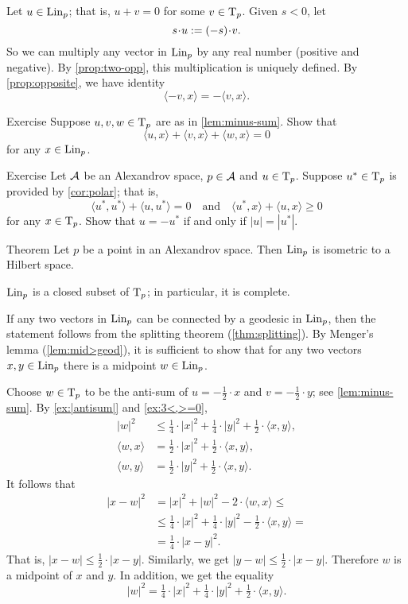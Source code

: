 Let $u\in \mathop{\rm Lin}\nolimits_p$; that is, $u+v=0$ for some $v\in\mathrm{T}_p$.
Given $s<0$, let 
\[s\cdot u\df (-s)\cdot v.\]
So we can multiply any vector in $\mathop{\rm Lin}\nolimits_p$ by any real number (positive and negative).
By \ref{prop:two-opp}, this multiplication is uniquely defined.
By \ref{prop:opposite}, we have identity
\[\langle -v,x\rangle=-\langle v,x\rangle.\]


\begin{thm}{Exercise}\label{ex:3<,>=0}
Suppose $u,v,w\in\mathrm{T}_p$ are as in \ref{lem:minus-sum}.
Show that
\[\langle u,x\rangle +\langle v,x\rangle +\langle w,x\rangle = 0\]
for any $x\in \mathop{\rm Lin}\nolimits_p$.
\end{thm}

\begin{thm}{Exercise}\label{ex:-u}
Let $\mathcal{A}$ be an Alexandrov space,
$p\in \mathcal{A}$ and $u\in \mathrm{T}_p$.
Suppose $u^*\in \mathrm{T}_p$ is provided by \ref{cor:polar};
that is, 
\[\langle u^*,u^*\rangle +\langle u,u^*\rangle = 0
\quad\text{and}\quad
\langle u^*,x\rangle +\langle u,x\rangle \ge 0
\]
for any $x\in \mathrm{T}_p$.
Show that $u=-u^*$ if and only if $|u|=|u^*|$.
\end{thm}

\begin{thm}{Theorem}\label{thm:lin-subcone}
Let $p$ be a point in an Alexandrov space. 
Then $\mathop{\rm Lin}\nolimits_p$ is isometric to a Hilbert space.
\end{thm}

$\mathop{\rm Lin}\nolimits_p$ is a closed subset of $\mathrm{T}_p$;
in particular, it is complete.

If any two vectors in $\mathop{\rm Lin}\nolimits_p$ can be connected by a geodesic in $\mathop{\rm Lin}\nolimits_p$,
then the statement follows from the splitting theorem (\ref{thm:splitting}).
By Menger's lemma (\ref{lem:mid>geod}), it is sufficient to show that for any two vectors $x,y\in\mathop{\rm Lin}\nolimits_p$
there is a midpoint $w\in \mathop{\rm Lin}\nolimits_p$.

Choose $w\in \mathrm{T}_p$ to be the anti-sum of $u=-\tfrac{1}{2}\cdot x$ and $v=-\tfrac{1}{2}\cdot y$;
see \ref{lem:minus-sum}.
By \ref{ex:|antisum|} and \ref{ex:3<,>=0},
\begin{align*}
|w|^2&\le \tfrac14\cdot |x|^2+\tfrac14\cdot|y|^2+\tfrac12\cdot\langle x,y\rangle,
\\
\langle w,x\rangle&= \tfrac12\cdot|x|^2+\tfrac12\cdot\langle x,y\rangle,
\\
\langle w,y\rangle&= \tfrac12\cdot|y|^2+\tfrac12\cdot\langle x,y\rangle.
\end{align*}
It follows that 
\begin{align*}
|x-w|^2
&= |x|^2+|w|^2-2\cdot\langle w,x\rangle\le
\\
&\le \tfrac14\cdot |x|^2+\tfrac14\cdot|y|^2-\tfrac12\cdot\langle x,y\rangle=
\\
&=\tfrac14\cdot|x-y|^2.
\end{align*}
That is, $|x-w|\le \tfrac12\cdot|x-y|$.
Similarly, we get $|y-w|\le \tfrac12\cdot|x-y|$.
Therefore $w$ is a midpoint of $x$ and $y$.
In addition, we get the equality 
\[|w|^2= \tfrac14\cdot |x|^2+\tfrac14\cdot|y|^2+\tfrac12\cdot\langle x,y\rangle.\]

